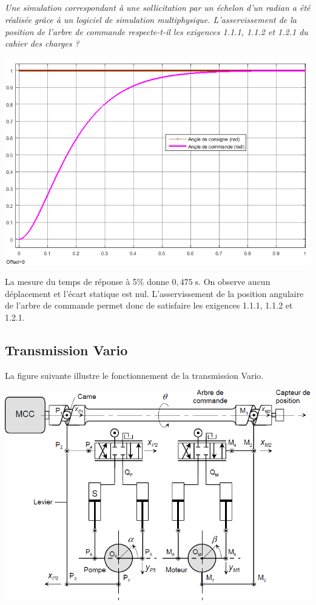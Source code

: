 \documentclass[10pt,fleqn]{article} %
\begin{document}
\begin{multicols}{2}
\subparagraph{}
\textit{Une simulation correspondant à une sollicitation par un échelon d'un radian a été réalisée grâce à un logiciel de simulation multiphysique. L'asservissement de la position de l'arbre de commande respecte-t-il les exigences 1.1.1, 1.1.2 et 1.2.1 du cahier des charges ?}
\begin{center}
\includegraphics[width=.45\textwidth]{images/simu_1}
\end{center}

\begin{corrige}
La mesure du temps de réponse à 5\% donne $0,475 \; \text{s}$. On observe aucun déplacement et l'écart statique est nul. L'asservissement de la position angulaire de l'arbre de commande permet donc de satisfaire les exigences 1.1.1, 1.1.2 et 1.2.1.
\end{corrige}


\subsection*{Transmission Vario}
La figure suivante illustre le fonctionnement de la transmission Vario.

\begin{center}
\includegraphics[width=.49\textwidth]{images/CommandeTransmission}
\end{center}


\end{multicols}
\end{document}
